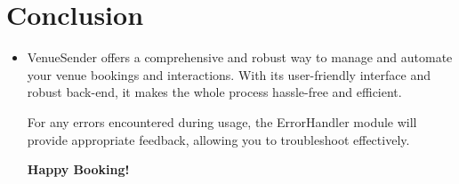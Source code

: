 \documentclass{article}
\begin{document}
\section{Conclusion}

\begin{itemize}
\item VenueSender offers a comprehensive and robust way to manage and automate your venue bookings and interactions. With its user-friendly interface and robust back-end, it makes the whole process hassle-free and efficient.

For any errors encountered during usage, the ErrorHandler module will provide appropriate feedback, allowing you to troubleshoot effectively.

\textbf{Happy Booking!}
\end{itemize}
\end{document}
